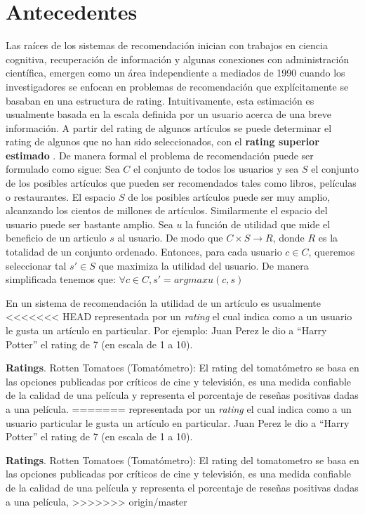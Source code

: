 \section{Antecedentes}

Las raíces de los sistemas de recomendación inician con trabajos en
ciencia cognitiva, recuperación de información y algunas conexiones con
administración científica, emergen como un área independiente a mediados
de 1990 cuando los investigadores se enfocan en problemas de
recomendación que explícitamente se basaban en una estructura de rating.
Intuitivamente, esta estimación es usualmente basada en la escala
definida por un usuario acerca de una breve información. A partir del
rating de algunos artículos se puede determinar el rating de algunos que
no han sido seleccionados, con el \textbf{rating superior estimado} . De
manera formal el problema de recomendación puede ser formulado como
sigue: Sea $C$ el conjunto de todos los usuarios y sea $S$ el
conjunto de los posibles artículos que pueden ser recomendados tales
como libros, películas o restaurantes. El espacio $S$ de los posibles
artículos puede ser muy amplio, alcanzando los cientos de millones de
artículos. Similarmente el espacio del usuario puede ser bastante
amplio. Sea $u$ la función de utilidad que mide el beneficio de un
articulo $s$ al usuario. De modo que $C \times S \rightarrow R$,
donde $R$ es la totalidad de un conjunto ordenado. Entonces, para cada
usuario $c \in C$, queremos seleccionar tal $s' \in S $ que
maximiza la utilidad del usuario. De manera simplificada tenemos que:
$\forall c \in C, s'=arg max u(c,s)$

En un sistema de recomendación la utilidad de un artículo es usualmente
<<<<<<< HEAD
representada por un \emph{rating} el cual indica como a un usuario le gusta un artículo en particular. Por ejemplo: Juan Perez le dio a
``Harry Potter'' el rating de 7 (en escala de 1 a 10).

\textbf{Ratings}. Rotten Tomatoes (Tomatómetro): El rating del
tomatómetro se basa en las opciones publicadas por críticos de cine y
televisión, es una medida confiable de la calidad de una película y
representa el porcentaje de reseñas positivas dadas a una película.
=======
representada por un \emph{rating} el cual indica como a un usuario
particular le gusta un artículo en particular. Juan Perez le dio a
``Harry Potter'' el rating de 7 (en escala de 1 a 10).

\textbf{Ratings}. Rotten Tomatoes (Tomatómetro): El rating del
tomatometro se basa en las opciones publicadas por críticos de cine y
televisión, es una medida confiable de la calidad de una película y
representa el porcentaje de reseñas positivas dadas a una película,
>>>>>>> origin/master

